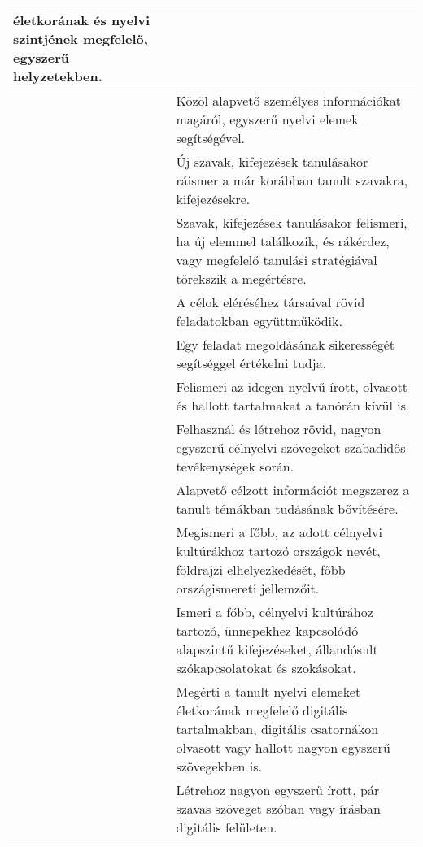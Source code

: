 \begin{longtable}[]{p{\evflength}@{\strut}>{\begin{minipage}{\columnlength}\strut}l<{\strut\end{minipage}}}
  életkorának és nyelvi szintjének megfelelő, egyszerű helyzetekben.
\tabularnewline
\hline
&
  Közöl alapvető személyes információkat magáról, egyszerű nyelvi elemek
  segítségével.
\tabularnewline
\hline
&
  Új szavak, kifejezések tanulásakor ráismer a már korábban tanult
  szavakra, kifejezésekre.
\tabularnewline
\hline
&
  Szavak, kifejezések tanulásakor felismeri, ha új elemmel találkozik, és
  rákérdez, vagy megfelelő tanulási stratégiával törekszik a megértésre.
\tabularnewline
\hline
&
  A célok eléréséhez társaival rövid feladatokban együttműködik.
\tabularnewline
\hline
&
  Egy feladat megoldásának sikerességét segítséggel értékelni tudja.
\tabularnewline
\hline
&
  Felismeri az idegen nyelvű írott, olvasott és hallott tartalmakat a
  tanórán kívül is.
\tabularnewline
\hline
&
  Felhasznál és létrehoz rövid, nagyon egyszerű célnyelvi szövegeket
  szabadidős tevékenységek során.
\tabularnewline
\hline
&
  Alapvető célzott információt megszerez a tanult témákban tudásának
  bővítésére.
\tabularnewline
\hline
&
  Megismeri a főbb, az adott célnyelvi kultúrákhoz tartozó országok
  nevét, földrajzi elhelyezkedését, főbb országismereti jellemzőit.
\tabularnewline
\hline
&
  Ismeri a főbb, célnyelvi kultúrához tartozó, ünnepekhez kapcsolódó
  alapszintű kifejezéseket, állandósult szókapcsolatokat és szokásokat.
\tabularnewline
\hline
&
  Megérti a tanult nyelvi elemeket életkorának megfelelő digitális
  tartalmakban, digitális csatornákon olvasott vagy hallott nagyon
  egyszerű szövegekben is.
\tabularnewline
\hline
&
  Létrehoz nagyon egyszerű írott, pár szavas szöveget szóban vagy
  írásban digitális felületen.
\tabularnewline
\hline
\end{longtable}



\settowidth{\evflength}{\usebox{\evfbox}}
\setlength{\columnlength}{\textwidth}
\addtolength{\columnlength}{-\evflength}

